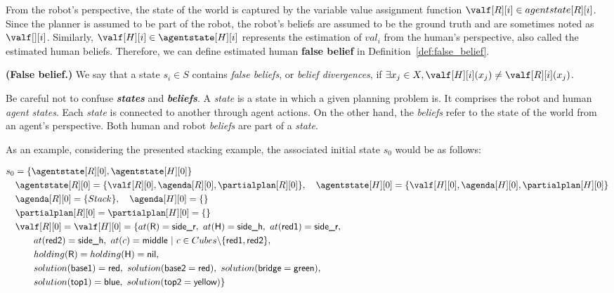 From the robot's perspective, the state of the world is captured by the variable value assignment function $\valf[R][i] \in \\agentstate[R][i]$. Since the planner is assumed to be part of the robot, the robot's beliefs are assumed to be the ground truth and are sometimes noted as $\valf[][i]$. 
Similarly, $\valf[H][i] \in \agentstate[H][i]$ represents the estimation of $val_i$ from the human's perspective, also called the estimated human beliefs. 
Therefore, we can define estimated human \textbf{false belief} in Definition~\ref{def:false_belief}.

\begin{definition}
    \textbf{(False belief.)} We say that a state $s_i \in S$ contains \emph{false beliefs}, or \emph{belief divergences}, if $\exists x_j \in X, \valf[H][i](x_j) \neq \valf[R][i](x_j)$. 
    \label{def:false_belief}
\end{definition}


Be careful not to confuse \textbf{\textit{states}} and \textbf{\textit{beliefs}}. A \textit{state} is a state in which a given planning problem is. It comprises the robot and human \textit{agent states}. Each \textit{state} is connected to another through agent actions. On the other hand, the \textit{beliefs} refer to the state of the world from an agent's perspective. Both human and robot \textit{beliefs} are part of a \textit{state}.



As an example, considering the presented stacking example, the associated initial state $s_0$ would be as follows: 

{\small
\begin{align*}
&s_0 = \{\agentstate[R][0], \agentstate[H][0]\} \\
&\quad \agentstate[R][0] = \{ \valf[R][0], \agenda[R][0], \partialplan[R][0] \}, \quad \agentstate[H][0] = \{ \valf[H][0], \agenda[H][0], \partialplan[H][0] \} \\
&\quad \agenda[R][0] = \{ Stack \}, \quad \agenda[H][0] = \{  \} \\
&\quad \partialplan[R][0] = \partialplan[H][0] = \{  \} \\
&\quad \valf[R][0] = \valf[H][0] = \{at(\textsf{R}) = \textsf{side\_r},~at(\textsf{H}) = \textsf{side\_h}, ~at(\textsf{red1}) = \textsf{side\_r}, \\
&\quad \quad \quad at(\textsf{red2}) = \textsf{side\_h}, ~at(c) = \textsf{middle} ~|~ c \in Cubes\backslash\{ \textsf{red1}, \textsf{red2} \}, \\
&\quad \quad \quad holding(\textsf{R}) = holding(\textsf{H}) = \textsf{nil}, \\
&\quad \quad \quad solution(\textsf{base1}) = \textsf{red}, ~solution(\textsf{base2} = \textsf{red}), ~solution(\textsf{bridge} = \textsf{green}),   \\
&\quad \quad \quad solution(\textsf{top1}) = \textsf{blue}, ~solution(\textsf{top2} = \textsf{yellow}) \}  \\
\end{align*}
}


